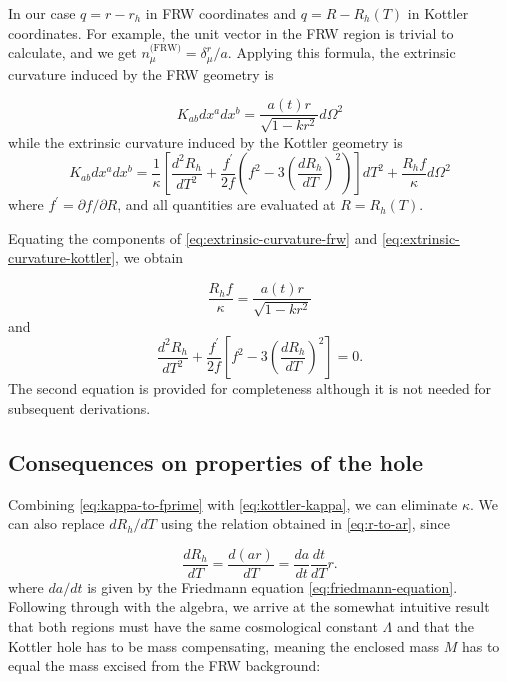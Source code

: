 In our case $q = r-r_h$ in FRW coordinates and $q = R - R_h(T)$ in Kottler coordinates. For example, the unit vector in the FRW region is trivial to calculate, and we get $n_{\mu}^{\text{(FRW)}} = \delta^r_{\mu}/a$. Applying this formula, the extrinsic curvature induced by the FRW geometry is

\begin{equation}
  K_{ab} dx^a dx^b = \frac{a(t)r}{\sqrt{1-kr^2}} d \Omega^2
  \label{eq:extrinsic-curvature-frw}
\end{equation}
while the extrinsic curvature induced by the Kottler geometry is
\begin{equation}
  K_{ab} dx^a dx^b = \frac{1}{\kappa} \left [ \frac{d^2R_h}{dT^2} + \frac{f^{\prime}}{2f}\left (f^2 - 3 \left (\frac{dR_h}{dT}\right )^2 \right) \right] dT^2 + \frac{R_h f}{\kappa} d \Omega^2
  \label{eq:extrinsic-curvature-kottler}
\end{equation}
where $f^{\prime} = \partial f / \partial R$, and all quantities are evaluated at $R = R_h(T)$.

Equating the components of \autoref{eq:extrinsic-curvature-frw} and \autoref{eq:extrinsic-curvature-kottler}, we obtain

\begin{equation}
  \frac{R_h f}{\kappa} = \frac{a(t)r}{\sqrt{1-kr^2}}
  \label{eq:kappa-to-fprime}
\end{equation}
and
\begin{equation}
  \frac{d^2R_h}{dT^2} + \frac{f^{\prime}}{2f}\left [f^2 - 3 \left (\frac{dR_h}{dT}\right )^2 \right ] = 0.
\end{equation}
The second equation is provided for completeness although it is not needed for subsequent derivations. 

\subsection{Consequences on properties of the hole}

Combining \autoref{eq:kappa-to-fprime} with \autoref{eq:kottler-kappa}, we can eliminate $\kappa$. We can also replace $dR_h/dT$ using the relation obtained in \autoref{eq:r-to-ar}, since

\begin{equation}
  \frac{dR_h}{dT} = \frac{d(ar)}{dT} = \frac{da}{dt}\frac{dt}{dT}r.
\end{equation}
where $da/dt$ is given by the Friedmann equation \ref{eq:friedmann-equation}. Following through with the algebra, we arrive at the somewhat intuitive result that both regions must have the same cosmological constant $\Lambda$ and that the Kottler hole has to be mass compensating, meaning the enclosed mass $M$ has to equal the mass excised from the FRW background:

